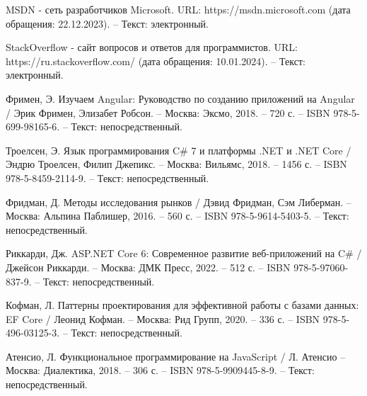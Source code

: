 \begin{thebibliography}{14}
     MSDN -\- сеть разработчиков Microsoft. URL: https://msdn.microsoft.com (дата обращения: 22.12.2023). – Текст: электронный.

     StackOverflow -\- сайт вопросов и ответов для программистов. URL: https://ru.stackoverflow.com/ (дата обращения: 10.01.2024). – Текст: электронный.

     Фримен, Э. Изучаем Angular: Руководство по созданию приложений на Angular / Эрик Фримен, Элизабет Робсон. – Москва: Эксмо, 2018. – 720 с. – ISBN 978-5-699-98165-6. – Текст: непосредственный.

     Троелсен, Э. Язык программирования C\# 7 и платформы .NET и .NET Core / Эндрю Троелсен, Филип Джепикс. – Москва: Вильямс, 2018. – 1456 с. – ISBN 978-5-8459-2114-9. – Текст: непосредственный.

     Фридман, Д. Методы исследования рынков / Дэвид Фридман, Сэм Либерман. – Москва: Альпина Паблишер, 2016. – 560 с. – ISBN 978-5-9614-5403-5. – Текст: непосредственный.

     Риккарди, Дж. ASP.NET Core 6: Современное развитие веб-приложений на C\# / Джейсон Риккарди. – Москва: ДМК Пресс, 2022. – 512 с. – ISBN 978-5-97060-837-9. – Текст: непосредственный.

     Кофман, Л. Паттерны проектирования для эффективной работы с базами данных: EF Core / Леонид Кофман. – Москва: Рид Групп, 2020. – 336 с. – ISBN 978-5-496-03125-3. – Текст: непосредственный.

     Атенсио, Л. Функциональное программирование на JavaScript / Л. Атенсио – Москва: Диалектика, 2018. – 306 с. – ISBN 978-5-9909445-8-9. – Текст: непосредственный.

\end{thebibliography}
